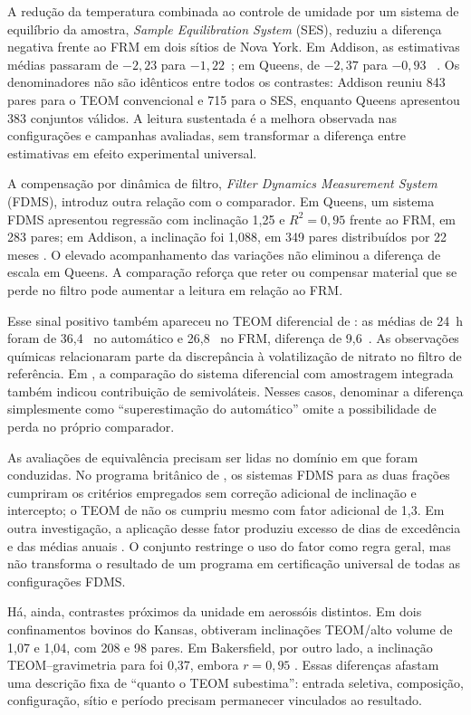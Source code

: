 A redução da temperatura combinada ao controle de umidade por um sistema de equilíbrio da amostra, \textit{Sample Equilibration System} (SES), reduziu a diferença negativa frente ao FRM em dois sítios de Nova York. Em Addison, as estimativas médias passaram de $-2{,}23$ para $-1{,}22$~\ugm{}; em Queens, de $-2{,}37$ para $-0{,}93$~\ugm{} \parencite{rsl144}. Os denominadores não são idênticos entre todos os contrastes: Addison reuniu 843 pares para o TEOM convencional e 715 para o SES, enquanto Queens apresentou 383 conjuntos válidos. A leitura sustentada é a melhora observada nas configurações e campanhas avaliadas, sem transformar a diferença entre estimativas em efeito experimental universal.

A compensação por dinâmica de filtro, \textit{Filter Dynamics Measurement System} (FDMS), introduz outra relação com o comparador. Em Queens, um sistema FDMS apresentou regressão com inclinação 1,25 e $R^2=0{,}95$ frente ao FRM, em 283 pares; em Addison, a inclinação foi 1,088, em 349 pares distribuídos por 22 meses \parencite{rsl105}. O elevado acompanhamento das variações não eliminou a diferença de escala em Queens. A comparação reforça que reter ou compensar material que se perde no filtro pode aumentar a leitura em relação ao FRM.

Esse sinal positivo também apareceu no TEOM diferencial de \textcite{rsl101}: as médias de 24~h foram de 36,4~\ugm{} no automático e 26,8~\ugm{} no FRM, diferença de 9,6~\ugm{}. As observações químicas relacionaram parte da discrepância à volatilização de nitrato no filtro de referência. Em \textcite{rsl202}, a comparação do sistema diferencial com amostragem integrada também indicou contribuição de semivoláteis. Nesses casos, denominar a diferença simplesmente como \enquote{superestimação do automático} omite a possibilidade de perda no próprio comparador.

As avaliações de equivalência precisam ser lidas no domínio em que foram conduzidas. No programa britânico de \textcite{rsl161}, os sistemas FDMS para as duas frações cumpriram os critérios empregados sem correção adicional de inclinação e intercepto; o TEOM de \MPdez{} não os cumpriu mesmo com fator adicional de 1,3. Em outra investigação, a aplicação desse fator produziu excesso de dias de excedência e das médias anuais \parencite{rsl066}. O conjunto restringe o uso do fator como regra geral, mas não transforma o resultado de um programa em certificação universal de todas as configurações FDMS.

Há, ainda, contrastes próximos da unidade em aerossóis distintos. Em dois confinamentos bovinos do Kansas, \textcite{rsl106} obtiveram inclinações TEOM/alto volume de 1,07 e 1,04, com 208 e 98 pares. Em Bakersfield, por outro lado, a inclinação TEOM--gravimetria para \MPdez{} foi 0,37, embora $r=0{,}95$ \parencite{rsl129}. Essas diferenças afastam uma descrição fixa de \enquote{quanto o TEOM subestima}: entrada seletiva, composição, configuração, sítio e período precisam permanecer vinculados ao resultado.

